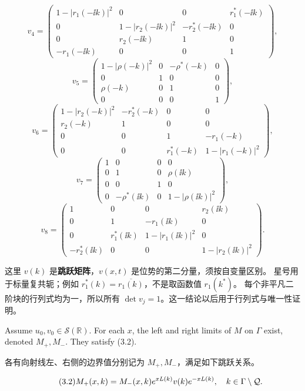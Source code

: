 \[
v_4=\begin{pmatrix}1-|r_1(-\ii k)|^2&0&0&r_1^*(-\ii k)\\0&1-|r_2(-\ii k)|^2&-r_2^*(-\ii k)&0\\0&r_2(-\ii k)&1&0\\-r_1(-\ii k)&0&0&1\end{pmatrix},
\]
\[
v_5=\begin{pmatrix}1-|\rho(-k)|^2&0&-\rho^*(-k)&0\\0&1&0&0\\\rho(-k)&0&1&0\\0&0&0&1\end{pmatrix},
\]
\[
v_6=\begin{pmatrix}1-|r_2(-k)|^2&-r_2^*(-k)&0&0\\r_2(-k)&1&0&0\\0&0&1&-r_1(-k)\\0&0&r_1^*(-k)&1-|r_1(-k)|^2\end{pmatrix},
\]
\[
v_7=\begin{pmatrix}1&0&0&0\\0&1&0&\rho(\ii k)\\0&0&1&0\\0&-\rho^*(\ii k)&0&1-|\rho(\ii k)|^2\end{pmatrix},
\]
\[
v_8=\begin{pmatrix}1&0&0&r_2(\ii k)\\0&1&-r_1(\ii k)&0\\0&r_1^*(\ii k)&1-|r_1(\ii k)|^2&0\\-r_2^*(\ii k)&0&0&1-|r_2(\ii k)|^2\end{pmatrix}.
\]
\begin{note}
这里 $v(k)$ 是\textbf{跳跃矩阵}，$v(x,t)$ 是位势的第二分量，须按自变量区别。
星号用于标量复共轭；例如 $r_1^*(k)=\overline{r_1(k)}$，不是取函数值 $r_1(k^*)$。
每个非平凡二阶块的行列式均为一，所以所有 $\det v_j=1$。这一结论以后用于行列式与唯一性证明。
\end{note}
\begin{paperlemmaen}
Assume $u_0,v_0\in\mathcal S(\mathbb R)$. For each $x$, the left and right limits of $M$ on $\Gamma$ exist, denoted $M_+,M_-$. They satisfy (3.2).
\end{paperlemmaen}
\begin{paperlemmacn*}
各有向射线左、右侧的边界值分别记为 $M_+,M_-$，满足如下跳跃关系。
\end{paperlemmacn*}
\begin{equation}\originaleq{3.2}
M_+(x,k)=M_-(x,k)e^{xL(k)}v(k)e^{-xL(k)},\quad k\in\Gamma\setminus\mathcal Q.
\end{equation}
